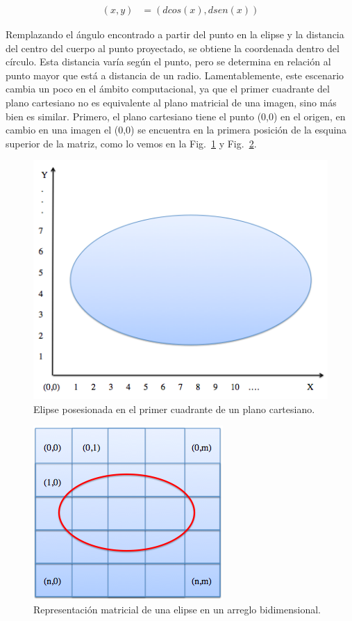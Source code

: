 \begin{align}
  (x,y) & = (dcos(x), dsen(x)) \label{eq:parametrica}
\end{align}

Remplazando el ángulo encontrado a partir del punto en la elipse y la
distancia del centro del cuerpo al punto proyectado, se obtiene la
coordenada dentro del círculo. Esta distancia varía según el punto,
pero se determina en relación al punto mayor que está a distancia de
un radio.  Lamentablemente, este escenario cambia un poco en el ámbito
computacional, ya que el primer cuadrante del plano cartesiano no es
equivalente al plano matricial de una imagen, sino más bien es
similar. Primero, el plano cartesiano tiene el punto (0,0) en el
origen, en cambio en una imagen el (0,0) se encuentra en la primera
posición de la esquina superior de la matriz, como lo vemos en la
Fig.~\ref{img:elipse} y Fig.~\ref{img:matrizElipse}.

\begin{figure}[hb!]
  \begin{center}
    \includegraphics[scale=.5]{image/elipse}
  \end{center}
  \caption{Elipse posesionada en el primer cuadrante de un plano
  cartesiano.}\label{img:elipse}
\end{figure}

\begin{figure}[hb!]
  \begin{center}
    \includegraphics[scale=.5]{image/matrizElipse}
  \end{center}
  \caption{Representación matricial de una elipse en un arreglo
  bidimensional.}\label{img:matrizElipse}
\end{figure}

